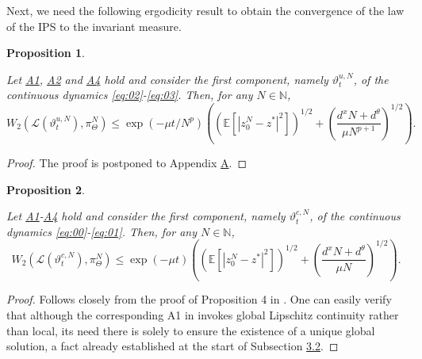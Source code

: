 \documentclass[a4paper, 10pt]{article}
\theoremstyle{plain}%
\newtheorem{proposition}{Proposition}%
\begin{document}
\noindent Next, we need the following ergodicity result to obtain the convergence of the law of the IPS to the invariant measure.\\ 
\par \noindent \begin{proposition}\hypertarget{Prop3}{} Let \hyperlink{Assum1}{A1}, \hyperlink{Assum2}{A2} and \hyperlink{Assum4}{A4} hold and consider the first component, namely $\vartheta^{u,N}_t$, of the continuous dynamics \eqref{eq:02}-\eqref{eq:03}. Then, for any $N\in\mathbb{N}$,
$$W_2\left(\mathcal{L}(\vartheta^{u,N}_t),\pi_{\Theta}^N\right)\leq \exp{(-\mu t/N^{p})}\left(\left(\mathbb{E}\left[|z_0^N-z^*|^2\right]\right)^{1/2}+\left(\dfrac{d^x N+d^{\theta}}{\mu N^{p+1}}\right)^{1/2}\right).$$\end{proposition}
\begin{proof}
    The proof is postponed to Appendix \hyperref[Proof3]{A}. %
\end{proof}
\par \noindent \begin{proposition}\hypertarget{Prop7}{} Let \hyperlink{Assum1}{A1}-\hyperlink{Assum4}{A4} hold and consider the first component, namely $\vartheta^{c,N}_t$, of the continuous dynamics \eqref{eq:00}-\eqref{eq:01}. Then, for any $N\in\mathbb{N}$,
$$W_2\left(\mathcal{L}(\vartheta^{c,N}_t),\pi_{\Theta}^N\right)\leq \exp{(-\mu t)}\left(\left(\mathbb{E}\left[|z_0^N-z^*|^2\right]\right)^{1/2}+\left(\dfrac{d^x N+d^{\theta}}{\mu N}\right)^{1/2}\right).$$\end{proposition}
\begin{proof}
    Follows closely from the proof of Proposition 4 in \cite{Ipla}. One can easily verify that although the corresponding A1 in \cite{Ipla} invokes global Lipschitz continuity rather than local, its need there is solely to ensure the existence of a unique global solution, a fact already established at the start of Subsection \hyperref[statements] {3.2}.
\end{proof}
\end{document}
